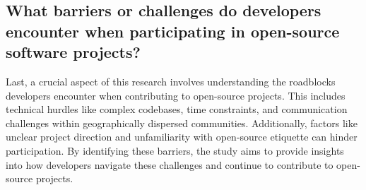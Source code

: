 \subsection{What barriers or challenges do developers encounter when participating in open-source software projects?}

Last, a crucial aspect of this research involves understanding the roadblocks developers encounter when contributing to open-source projects. This includes technical hurdles like complex codebases, time constraints, and communication challenges within geographically dispersed communities. Additionally, factors like unclear project direction and unfamiliarity with open-source etiquette can hinder participation. By identifying these barriers, the study aims to provide insights into how developers navigate these challenges and continue to contribute to open-source projects.


\clearpage  %
